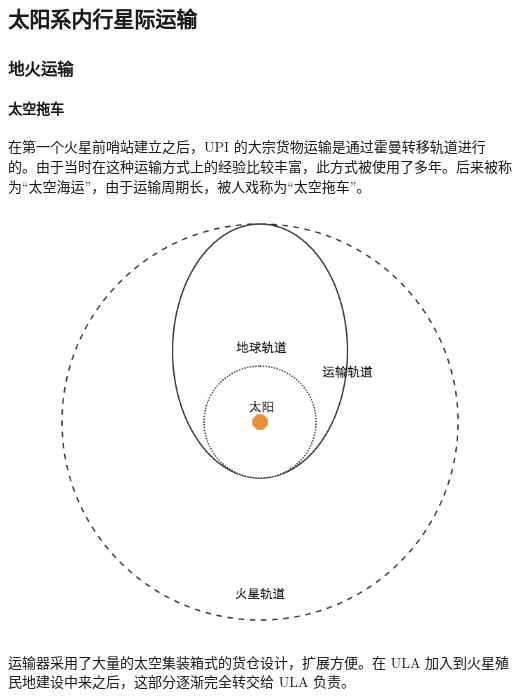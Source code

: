 \documentclass[letterpaper,10pt]{sphinxmanual}
\begin{document}
\subsection{太阳系内行星际运输}
\label{tech:id4}

\subsubsection{地火运输}
\label{tech:earth2mars}\label{tech:id5}\label{tech:index-2}

\paragraph{太空拖车}
\label{tech:id6}\label{tech:index-3}
在第一个火星前哨站建立之后，UPI 的大宗货物运输是通过霍曼转移轨道进行的。由于当时在这种运输方式上的经验比较丰富，此方式被使用了多年。后来被称为“太空海运”，由于运输周期长，被人戏称为“太空拖车”。
\begin{figure}[htbp]
\centering

\includegraphics{hohmannSystem.png}
\end{figure}

运输器采用了大量的太空集装箱式的货仓设计，扩展方便。在 ULA 加入到火星殖民地建设中来之后，这部分逐渐完全转交给 ULA 负责。
\end{document}
